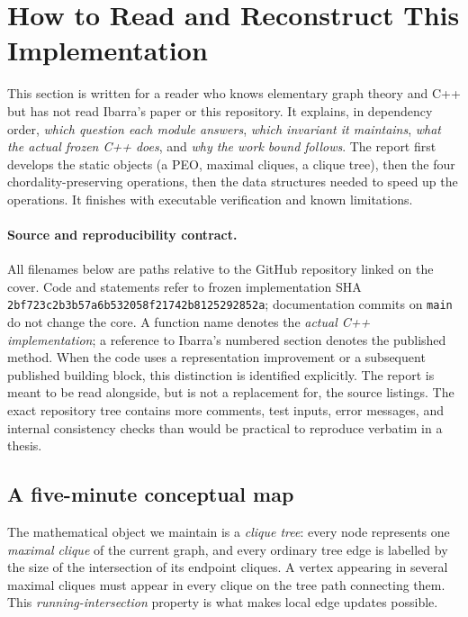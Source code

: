 \section{How to Read and Reconstruct This Implementation}
\label{sec:walkthrough}
This section is written for a reader who knows elementary graph theory and C++ but has not read Ibarra's paper or this repository.  It explains, in dependency order, \emph{which question each module answers}, \emph{which invariant it maintains}, \emph{what the actual frozen C++ does}, and \emph{why the work bound follows}.  The report first develops the static objects (a PEO, maximal cliques, a clique tree), then the four chordality-preserving operations, then the data structures needed to speed up the operations.  It finishes with executable verification and known limitations.

\paragraph{Source and reproducibility contract.}
All filenames below are paths relative to the GitHub repository linked on the cover.  Code and statements refer to frozen implementation SHA \texttt{2bf723c2b3b57a6b532058f21742b8125292852a}; documentation commits on \texttt{main} do not change the core.  A function name denotes the \emph{actual C++ implementation}; a reference to Ibarra's numbered section denotes the published method.  When the code uses a representation improvement or a subsequent published building block, this distinction is identified explicitly.  The report is meant to be read alongside, but is not a replacement for, the source listings.  The exact repository tree contains more comments, test inputs, error messages, and internal consistency checks than would be practical to reproduce verbatim in a thesis.

\subsection{A five-minute conceptual map}
The mathematical object we maintain is a \emph{clique tree}: every node represents one \emph{maximal clique} of the current graph, and every ordinary tree edge is labelled by the size of the intersection of its endpoint cliques.  A vertex appearing in several maximal cliques must appear in every clique on the tree path connecting them.  This \emph{running-intersection} property is what makes local edge updates possible.

